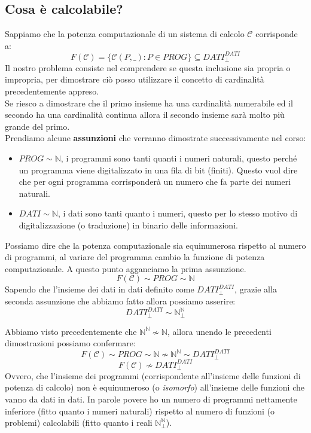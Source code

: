 \documentclass{article}
\begin{document}
\subsection{Cosa è calcolabile?}
Sappiamo che la potenza computazionale di un sistema di calcolo $\mathcal{C}$ corrisponde a:
$$F(\mathcal{C})=\{\mathcal{C}(P,\_):P\in PROG\}\subseteq DATI_{\bot}^{DATI}$$
Il nostro problema consiste nel comprendere se questa inclusione sia propria o impropria,
per dimostrare ciò posso utilizzare il concetto di cardinalità precedentemente appreso.\\
Se riesco a dimostrare che il primo insieme ha una cardinalità numerabile ed il secondo ha
una cardinalità continua allora il secondo insieme sarà molto più grande del primo.\\Prendiamo alcune
\textbf{assunzioni} che verranno dimostrate successivamente nel corso:
\begin{itemize}
    \item $PROG\sim\mathbb{N}$, i programmi sono tanti quanti i numeri naturali, questo
          perché un programma viene digitalizzato in una fila di bit (finiti). Questo vuol dire che per ogni
          programma corrisponderà un numero che fa parte dei numeri naturali.

    \item $DATI\sim\mathbb{N}$, i dati sono tanti quanto i numeri, questo per lo stesso motivo
          di digitalizzazione (o traduzione) in binario delle informazioni.
\end{itemize}
Possiamo dire che la potenza computazionale sia equinumerosa rispetto al numero di programmi,
al variare del programma cambio la funzione di potenza computazionale. A questo punto agganciamo
la prima assunzione.
$$F(\mathcal{C})\sim PROG\sim\mathbb{N}$$
Sapendo che l'insieme dei dati in dati definito come $DATI_{\bot}^{DATI}$, grazie alla
seconda assunzione che abbiamo fatto allora possiamo asserire:
$$DATI_{\bot}^{DATI}\sim\mathbb{N}_{\bot}^{\mathbb{N}}$$

Abbiamo visto precedentemente che $\mathbb{N}^{\mathbb{N}}\nsim\mathbb{N}$, allora unendo le precedenti
dimostrazioni possiamo confermare:
$$F(\mathcal{C})\sim PROG\sim\mathbb{N}\nsim\mathbb{N}^{\mathbb{N}}\sim DATI_{\bot}^{DATI}$$
$$F(\mathcal{C})\nsim DATI_{\bot}^{DATI}$$
Ovvero, che l'insieme dei programmi (corrispondente all'insieme delle funzioni di potenza di calcolo)
non è equinumeroso (o \textit{isomorfo}) all'insieme delle funzioni che vanno da dati in dati. In parole
povere ho un numero di programmi nettamente inferiore (fitto quanto i numeri naturali) rispetto al numero
di funzioni (o problemi) calcolabili (fitto quanto i reali $\mathbb{N}_{\bot}^{\mathbb{N}}$).
\end{document}
